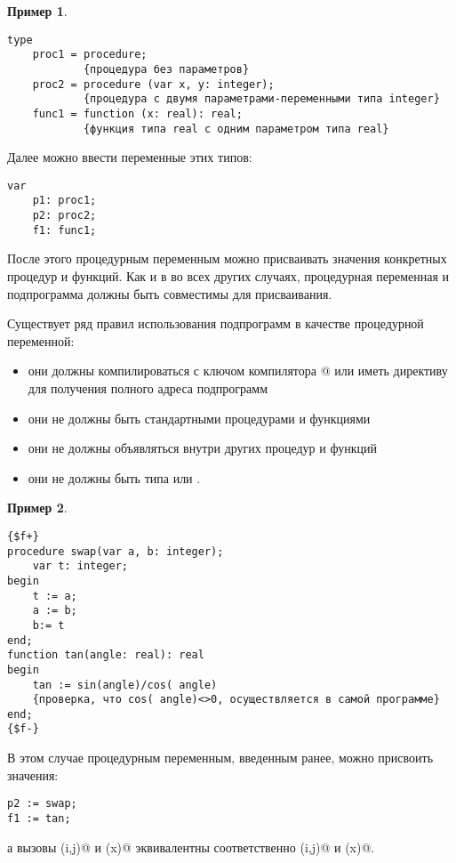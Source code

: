 \documentclass[12pt,a4paper]{article}
\theoremstyle{plain}
\theoremstyle{definition}
\newtheorem*{example}{Пример}
\theoremstyle{remark}
\begin{document}
\begin{example}
~\\
\begin{verbatim}
type
    proc1 = procedure;
            {процедура без параметров}
    proc2 = procedure (var x, y: integer);
            {процедура с двумя параметрами-переменными типа integer}
    func1 = function (x: real): real;
            {функция типа real с одним параметром типа real}
\end{verbatim}

Далее можно ввести переменные этих типов:

\begin{verbatim}
var
    p1: proc1;
    p2: proc2;
    f1: func1;
\end{verbatim}
\end{example}

После этого процедурным переменным можно присваивать значения конкретных процедур и функций. Как и в во всех других случаях, процедурная переменная и подпрограмма должны быть совместимы для присваивания.

Существует ряд правил использования подпрограмм в качестве процедурной переменной:
\begin{itemize}
\item они должны компилироваться с ключом компилятора @ или иметь директиву \verb@far@ для получения полного адреса подпрограмм
\item они не должны быть стандартными процедурами и функциями
\item они не должны объявляться внутри других процедур и функций
\item они не должны быть типа \verb@inline@ или \verb@interrupt@.
\end{itemize}

\begin{example}
~\\
\begin{verbatim}
{$f+}
procedure swap(var a, b: integer);
    var t: integer;
begin
    t := a;
    a := b;
    b:= t
end;
function tan(angle: real): real
begin 
    tan := sin(angle)/cos( angle)
    {проверка, что cos( angle)<>0, осуществляется в самой программе}
end;
{$f-}
\end{verbatim}

В этом случае процедурным переменным, введенным ранее, можно присвоить значения:
\begin{verbatim}
p2 := swap;
f1 := tan;
\end{verbatim}
а вызовы (i,j)@ и (x)@ эквивалентны соответственно \verb@swap(i,j)@ и \verb@tan(x)@.
\end{example}
\end{document}
